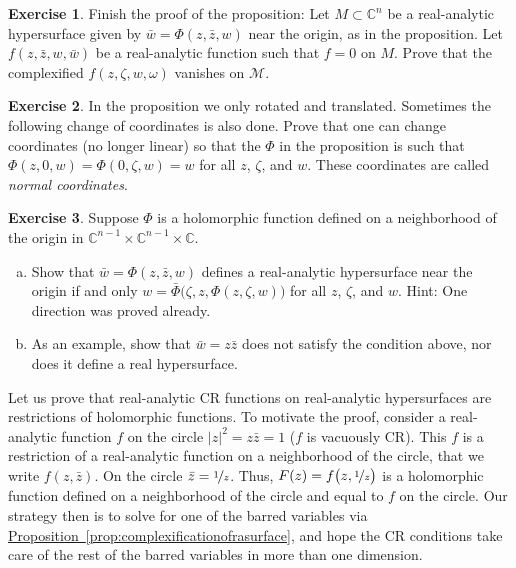 \documentclass[12pt,openany]{book}
\newcommand{\sabs}[1]{\lvert {#1} \rvert}
\newcommand{\C}{{\mathbb{C}}}
\newcommand{\sM}{{\mathscr{M}}}
\newcommand{\myindex}[1]{#1\index{#1}}
\theoremstyle{plain}
\theoremstyle{remark}
\theoremstyle{definition}
\newenvironment{exbox}{%
    \def\FrameCommand{\vrule width 1pt \relax\hspace{10pt}}%
    \MakeFramed{\advance\hsize-\width\FrameRestore}%
}{%
    \endMakeFramed
}
\newenvironment{exparts}{%
    \leavevmode\begin{enumerate}[a),noitemsep,topsep=0pt,parsep=0pt,partopsep=0pt]
}{%
    \end{enumerate}
}
\theoremstyle{exercise}
\newtheorem{exercise}{Exercise}[section]
\theoremstyle{example}
\newcommand{\propref}[1]{\hyperref[#1]{Proposition~\ref*{#1}}}
\begin{document}
\begin{exbox}
\begin{exercise}
Finish the proof of the proposition:
Let $M\subset \C^n$ be a real-analytic hypersurface given by
$\bar{w} = \Phi(z,\bar{z},w)$ near the origin, as in the proposition.  Let
$f(z,\bar{z},w,\bar{w})$ be a real-analytic function such that $f=0$
on $M$.  Prove that the complexified $f(z,\zeta,w,\omega)$ vanishes on
$\sM$.
\end{exercise}

\begin{exercise}
In the proposition we only rotated and translated.  Sometimes the following
change of coordinates is also done.  Prove that one can change coordinates
(no longer linear) so that the $\Phi$ in the proposition is
such that $\Phi(z,0,w) = \Phi(0,\zeta,w) = w$ for all $z$, $\zeta$, and $w$.
These coordinates are called \emph{\myindex{normal coordinates}}.
\end{exercise}

\begin{exercise}
Suppose
$\Phi$ is a holomorphic function defined on a neighborhood of the origin
in $\C^{n-1} \times \C^{n-1} \times \C$.
\begin{exparts}
\item
Show that $\bar{w} = \Phi(z,\bar{z},w)$ defines a real-analytic hypersurface
near the origin if and only
$w = \bar{\Phi}\bigl(\zeta,z,\Phi(z,\zeta,w)\bigr)$
for all $z$, $\zeta$, and $w$.  Hint: One direction was proved already.
\item
As an example, show that $\bar{w} = z\bar{z}$ does not satisfy the
condition above, nor does it define a real hypersurface.
\end{exparts}
\end{exercise}
\end{exbox}

Let us prove that real-analytic CR functions on real-analytic
hypersurfaces are restrictions
of holomorphic functions.  To motivate the proof, consider
a real-analytic function $f$ on the circle $\sabs{z}^2 = z \bar{z} = 1$
($f$ is vacuously CR).  This $f$
is a restriction of a real-analytic function on a
neighborhood of the circle, that we write $f(z,\bar{z})$.
On the circle
$\bar{z} = \nicefrac{1}{z}$.  Thus,
$F(z) = f\bigl(z,\nicefrac{1}{z}\bigr)$ is a holomorphic function
defined on a neighborhood of the circle and
equal to $f$ on the circle.
Our strategy then is to solve for one of the barred variables via
\propref{prop:complexificationofrasurface}, and hope
the CR conditions take care of the rest of the barred variables
in more than one dimension.
\end{document}
